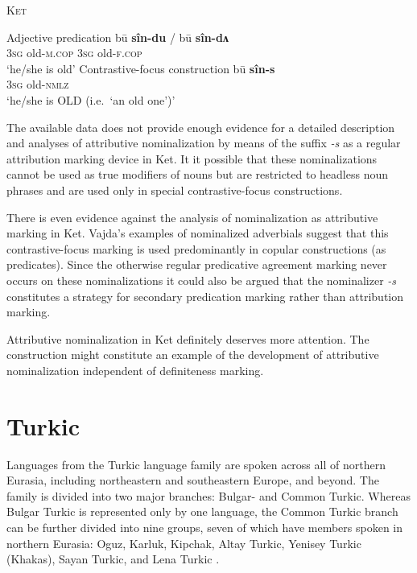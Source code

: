 \begin{exe}
\ex \textsc{Ket} \cite{vajda2005} \label{ket contrfoc}
\begin{xlist}
\ex	Adjective predication
\gll	bū \textbf{sîn-du} / bū \textbf{sîn-dʌ}\\
	3\textsc{sg} old-\textsc{m.cop} { } 3\textsc{sg} old-\textsc{f.cop}\\
\glt	‘he/she is old’
\ex	Contrastive-focus construction
\gll	bū \textbf{sîn-s}\\
	3\textsc{sg} old-\textsc{nmlz}\\
\glt	‘he/she is OLD (i.e.~‘an old one’)’
\end{xlist}
\end{exe}
The available data does not provide enough evidence for a detailed description and analyses of attributive nominalization by means of the suffix \textit{-s} as a regular attribution marking device in Ket. It it possible that these nominalizations cannot be used as true modifiers of nouns but are restricted to headless noun phrases and are used only in special contrastive-focus constructions.

There is even evidence against the analysis of nominalization as attributive marking in Ket. Vajda's examples of nominalized adverbials suggest that this contrastive-focus marking is used predominantly in copular constructions (as predicates). Since the otherwise regular predicative agreement marking never occurs on these nominalizations \cite[15]{vajda2004} it could also be argued that the nominalizer \textit{-s} constitutes a strategy for secondary predication marking rather than attribution marking.

Attributive nominalization in Ket definitely deserves more attention. The construction might constitute an example of the development of attributive nominalization independent of definiteness marking.

\section{Turkic}
Languages from the Turkic language family are spoken across all of northern Eurasia, including northeastern and southeastern Europe, and beyond. The family is divided into two major branches: Bulgar- and Common Turkic. Whereas Bulgar Turkic is represented only by one language, the Common Turkic branch can be further divided into nine groups, seven of which have members spoken in northern Eurasia: Oguz, Karluk, Kipchak, Altay Turkic, Yenisey Turkic (Khakas), Sayan Turkic, and Lena Turkic \cite[221]{salminen2007}.\\

